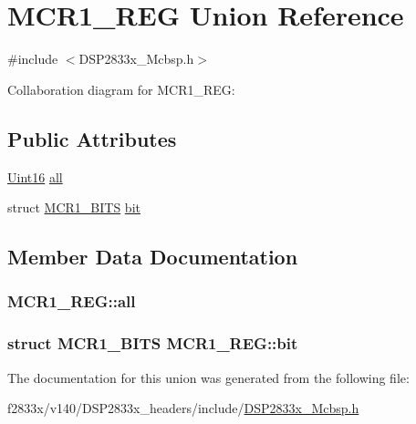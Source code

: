 \hypertarget{union_m_c_r1___r_e_g}{}\section{M\+C\+R1\+\_\+\+R\+E\+G Union Reference}
\label{union_m_c_r1___r_e_g}


{\ttfamily \#include $<$D\+S\+P2833x\+\_\+\+Mcbsp.\+h$>$}



Collaboration diagram for M\+C\+R1\+\_\+\+R\+E\+G\+:
\subsection*{Public Attributes}
\begin{DoxyCompactItemize}
\item 
\hyperlink{_d_s_p2833x___device_8h_a59a9f6be4562c327cbfb4f7e8e18f08b}{Uint16} \hyperlink{union_m_c_r1___r_e_g_a6ac5f975046681322e533e7dbc91067f}{all}
\item 
struct \hyperlink{struct_m_c_r1___b_i_t_s}{M\+C\+R1\+\_\+\+B\+I\+T\+S} \hyperlink{union_m_c_r1___r_e_g_a760617574a603d53a93f33fc1dfb3357}{bit}
\end{DoxyCompactItemize}


\subsection{Member Data Documentation}
\hypertarget{union_m_c_r1___r_e_g_a6ac5f975046681322e533e7dbc91067f}{}
\subsubsection[{all}]{ M\+C\+R1\+\_\+\+R\+E\+G\+::all}\label{union_m_c_r1___r_e_g_a6ac5f975046681322e533e7dbc91067f}
\hypertarget{union_m_c_r1___r_e_g_a760617574a603d53a93f33fc1dfb3357}{}
\subsubsection[{bit}]{\setlength{\rightskip}{0pt plus 5cm}struct {\bf M\+C\+R1\+\_\+\+B\+I\+T\+S} M\+C\+R1\+\_\+\+R\+E\+G\+::bit}\label{union_m_c_r1___r_e_g_a760617574a603d53a93f33fc1dfb3357}


The documentation for this union was generated from the following file\+:\begin{DoxyCompactItemize}
\item 
f2833x/v140/\+D\+S\+P2833x\+\_\+headers/include/\hyperlink{_d_s_p2833x___mcbsp_8h}{D\+S\+P2833x\+\_\+\+Mcbsp.\+h}\end{DoxyCompactItemize}
